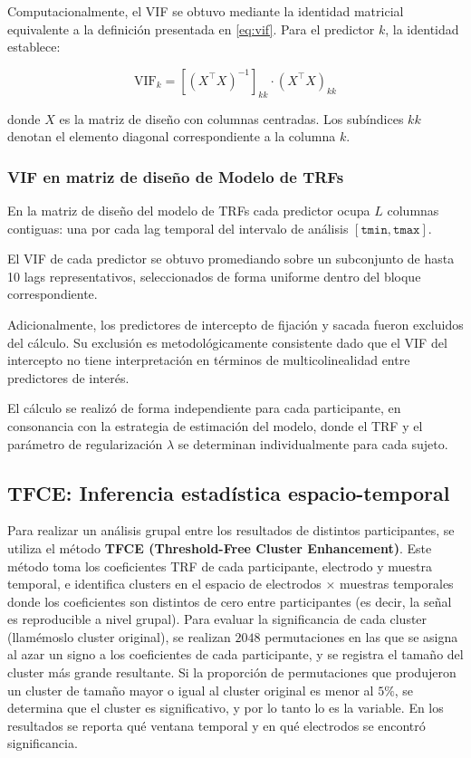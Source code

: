 Computacionalmente, el VIF se obtuvo mediante la identidad matricial equivalente a la definición presentada en \eqref{eq:vif}. Para el predictor $k$, la identidad establece:

\begin{equation}
    \label{eq:vif_identidad}
    \text{VIF}_k = \left[(X^\top X)^{-1}\right]_{kk} \cdot \left(X^\top X\right)_{kk}
\end{equation}

donde $X$ es la matriz de diseño con columnas centradas. Los subíndices $kk$ denotan el elemento diagonal correspondiente a la columna $k$. 

\subsubsection{VIF en matriz de diseño de Modelo de TRFs}
\label{subsec:vif}

En la matriz de diseño del modelo de TRFs cada predictor ocupa $L$ columnas contiguas: una por cada lag temporal del intervalo de análisis $[\texttt{tmin}, \texttt{tmax}]$.

El VIF de cada predictor se obtuvo promediando sobre un subconjunto de hasta 10 lags representativos, seleccionados de forma uniforme dentro del bloque correspondiente.

Adicionalmente, los predictores de intercepto de fijación y sacada fueron excluidos
del cálculo. Su exclusión es
metodológicamente consistente dado que el VIF del intercepto no tiene interpretación
en términos de multicolinealidad entre predictores de interés.

El cálculo se realizó de forma independiente para cada participante, en consonancia con la estrategia de estimación del modelo, donde el TRF y el 
parámetro de regularización $\lambda$ se determinan individualmente para cada 
sujeto. 


\subsection{TFCE: Inferencia estadística espacio-temporal}

Para realizar un análisis grupal entre los resultados de distintos participantes, se utiliza el método \textbf{TFCE (Threshold-Free Cluster Enhancement)}. Este método toma los coeficientes TRF de cada participante, electrodo y muestra temporal, e identifica clusters en el espacio de electrodos $\times$ muestras temporales donde los coeficientes son distintos de cero entre participantes (es decir, la señal es reproducible a nivel grupal). Para evaluar la significancia de cada cluster (llamémoslo cluster original), se realizan $2048$ permutaciones en las que se asigna al azar un signo a los coeficientes de cada participante, y se registra el tamaño del cluster más grande resultante. Si la proporción de permutaciones que produjeron un cluster de tamaño mayor o igual al cluster original es menor al $5\%$, se determina que el cluster es significativo, y por lo tanto lo es la variable. En los resultados se reporta qué ventana temporal y en qué electrodos se encontró significancia.

